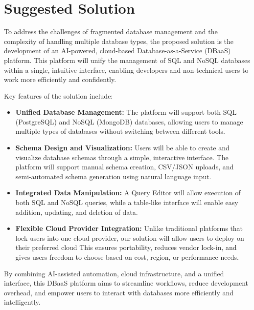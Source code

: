 \section{Suggested Solution}
To address the challenges of fragmented database management and the complexity of handling multiple database types, the proposed solution is the development of an AI-powered, cloud-based Database-as-a-Service (DBaaS) platform. This platform will unify the management of SQL and NoSQL databases within a single, intuitive interface, enabling developers and non-technical users to work more efficiently and confidently.

Key features of the solution include:
\begin{itemize}
    \item \textbf{Unified Database Management:} The platform will support both SQL (PostgreSQL) and NoSQL (MongoDB) databases, allowing users to manage multiple types of databases without switching between different tools.
    
    \item \textbf{Schema Design and Visualization:} Users will be able to create and visualize database schemas through a simple, interactive interface. The platform will support manual schema creation, CSV/JSON uploads, and semi-automated schema generation using natural language input.
    
    \item \textbf{Integrated Data Manipulation:} A Query Editor will allow execution of both SQL and NoSQL queries, while a table-like interface will enable easy addition, updating, and deletion of data.

    \item \textbf{Flexible Cloud Provider Integration:} Unlike traditional platforms that lock users into one cloud provider, our solution will allow users to deploy on their preferred cloud This ensures portability, reduces vendor lock-in, and gives users freedom to choose based on cost, region, or performance needs.
\end{itemize}

By combining AI-assisted automation, cloud infrastructure, and a unified interface, this DBaaS platform aims to streamline workflows, reduce development overhead, and empower users to interact with databases more efficiently and intelligently.